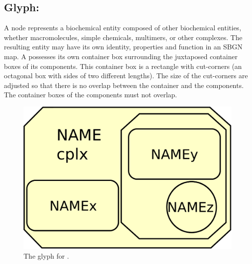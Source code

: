 

\subsection{Glyph: }\label{sec:complex}

A  node represents a biochemical entity composed of other biochemical entities, whether macromolecules, simple chemicals, multimers, or other complexes. The resulting entity may have its own identity, properties and function in an SBGN map. A  possesses its own container box surrounding the juxtaposed container boxes of its components.  This container box is a rectangle with cut-corners (an octagonal box with sides of two different lengths).  The size of the cut-corners are adjusted so that there is no overlap between the container and the components.  The container boxes of the components must not overlap.

\begin{figure}[H]
  \centering
  \includegraphics[scale = 0.3]{images/complex}
  \caption{The \PD glyph for .}
  \label{fig:complex}
\end{figure}



